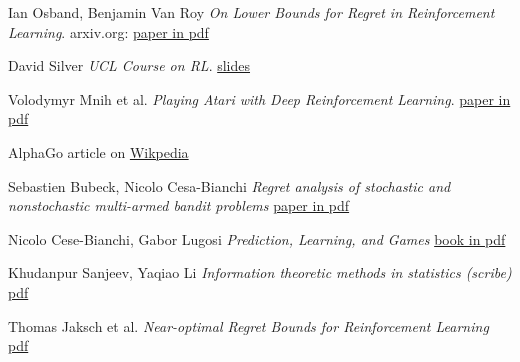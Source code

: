 \documentclass[a4paper]{article}
\begin{document}
\begin{thebibliography}{9}
	Ian Osband, Benjamin Van Roy
	\textit{On Lower Bounds for Regret in Reinforcement Learning}. 
	arxiv.org: \href{https://arxiv.org/pdf/1608.02732.pdf}{paper in pdf}
	
	David Silver
	\textit{UCL Course on RL}.
	\href{http://www0.cs.ucl.ac.uk/staff/d.silver/web/Teaching.html}{slides}
	
	Volodymyr Mnih et al.
	\textit{Playing Atari with Deep Reinforcement Learning}.
	\href{https://www.cs.toronto.edu/~vmnih/docs/dqn.pdf}{paper in pdf}

	AlphaGo article on
	\href{https://en.wikipedia.org/wiki/AlphaGo}{Wikpedia}

	Sebastien Bubeck, Nicolo Cesa-Bianchi
	\textit{Regret analysis of stochastic and nonstochastic multi-armed bandit problems}
	\href{https://arxiv.org/pdf/1204.5721.pdf}{paper in pdf}
	
	Nicolo Cese-Bianchi, Gabor Lugosi
	\textit{Prediction, Learning, and Games}
	\href{http://www.ii.uni.wroc.pl/~lukstafi/pmwiki/uploads/AGT/Prediction_Learning_and_Games.pdf}{book in pdf}	

	Khudanpur Sanjeev, Yaqiao Li
	\textit{Information theoretic methods in statistics (scribe)}
	\href{http://www.cs.mcgill.ca/~yli252/files/Pinsker.pdf}{pdf}

	Thomas Jaksch et al.
	\textit{Near-optimal Regret Bounds for Reinforcement Learning}
	\href{http://www.jmlr.org/papers/volume11/jaksch10a/jaksch10a.pdf}{pdf}	
	
\end{thebibliography}
\end{document}

